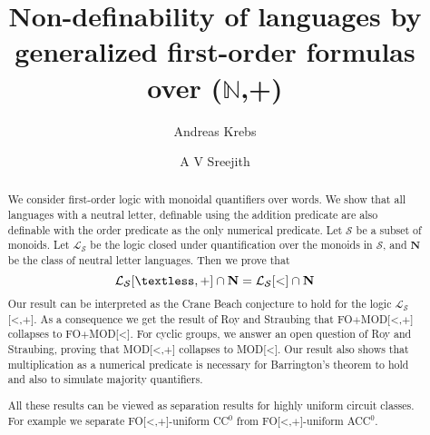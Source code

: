 \documentclass[envcountsame]{llncs}
\newcommand{\NL}{\mathbf{N}}
\begin{document}
\title{Non-definability of languages by generalized first-order formulas over ($\mathbb{N}$,+)}
\author{Andreas Krebs  \and
A V Sreejith}


\maketitle


\begin{abstract}
We consider first-order logic with monoidal quantifiers over words. We show that all languages with a neutral letter, definable using the 
addition predicate are also definable with the order predicate as the only numerical predicate. Let $\mathcal{S}$ be a subset of monoids.
Let $\mathcal{L_S}$ be the logic closed under quantification over the monoids in $\mathcal S$, and $\NL$ be the class of neutral letter languages.
Then we prove that 
$$\mathcal{L_S}[\textless,+] \cap \NL = \mathcal{L_S}[<] \cap \NL$$
Our result can be interpreted as the Crane Beach conjecture to hold for the logic $\mathcal{L_S}$[\textless,$+$].
As a consequence we get the result of Roy and Straubing that
FO$+$MOD[\textless,$+$] collapses to FO$+$MOD[\textless]. For cyclic groups, we answer an open question of Roy and Straubing, proving that MOD[\textless,$+$] collapses to MOD[\textless].
Our result also shows that multiplication as a numerical predicate is necessary for Barrington's theorem to hold and also to simulate
majority quantifiers.

All these results can be viewed as separation results for highly uniform circuit classes. For example we separate 
FO[\textless,$+$]-uniform CC$^0$ from FO[\textless,$+$]-uniform ACC$^0$.
\end{abstract}
\end{document}
